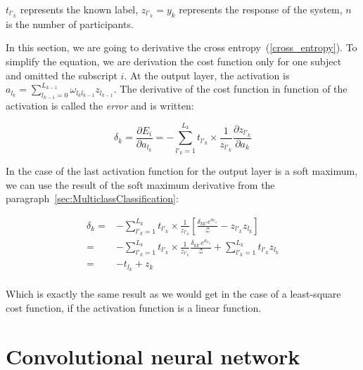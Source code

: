 \documentclass[final, paper=letter,5p,times,twocolumn]{elsarticle}
\begin{document}
$t_{l'_{k}}$ represents the known label, $z_{l'_{k}} = y_{k}$ represents the response of the system, $n$ is the number of participants. 

In this section, we are going to derivative the cross entropy~(\ref{cross_entropy}). To simplify the equation, we are derivation the cost function only for one subject and omitted the subscript $i$. At the output layer, the activation is $a_{l_{k}} = \sum_{l_{k-1} = 0}^{L_{k-1}} \omega_{l_{k}l_{k-1}} z_{l_{k-1}}$. The derivative of the cost function in function of the activation is called the {\it error} and is written:

\begin{equation}
  \delta_{k} = \frac{\partial E_{i}}{\partial a_{l_{k}}} = - \sum_{l'_{k} = 1}^{L_{k}} t_{l'_{k}} \times \frac{1}{z_{l'_{k}}} \frac{\partial z_{l'_{k}}}{\partial a_{k}}
  \label{cost_function_error}
\end{equation}

In the case of the last activation function for the output layer is a soft maximum, we can use the result of the soft maximum derivative from the paragraph~\ref{sec:MulticlassClassification}:

\begin{equation*}
  \begin{split}
    \delta_{k} = & - \sum_{l'_{k} = 1}^{L_{k}} t_{l'_{k}} \times \frac{1}{z_{l'_{k}}} \left \lbrack  \frac{\delta_{kk'} e^{a_{l'_{k}}}}{\mathcal{Z}} - z_{l'_{k}}z_{l_{k}} \right \rbrack \\
    = & - \sum_{l'_{k} = 1}^{L_{k}} t_{l'_{k}} \times \frac{1}{z_{l'_{k}}} \frac{\delta_{kk'} e^{a_{l'_{k}}}}{\mathcal{Z}} +  \sum_{l'_{k} = 1}^{L_{k}} t_{l'_{k}} z_{l_{k}} \\
    = & - t_{l_{k}} +  z_{k} \\
  \end{split}
\end{equation*}



Which is exactly the same result as we would get in the case of a least-square cost function, if the activation function is a linear function. 


\section{Convolutional neural network}
\end{document}
